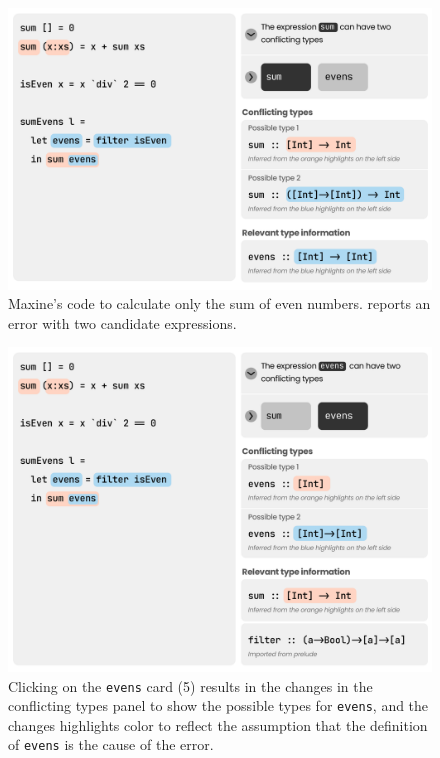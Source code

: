 \begin{figure}
        \centering
        \includegraphics[width=\linewidth]{images/balanced-mode-1.pdf}
        \caption{
            Maxine's code to calculate only the sum 
            of even numbers. \chameleon{} reports 
            an error with two candidate expressions.
        }
        \label{fig:balance-mode-1}
\end{figure}


\begin{figure}
   \centering
        \includegraphics[width=\linewidth]{images/balanced-mode-2.pdf}
        \caption{
            Clicking on the \texttt{evens} card (5) results in the changes in the
            conflicting types panel to show the possible types for \texttt{evens},
            and the changes highlights color to reflect the assumption that the
            definition of \texttt{evens} is the cause of the error.  
        }
        \label{fig:balance-mode-2}
\end{figure}



